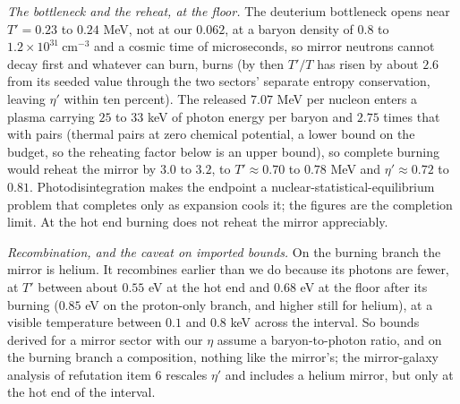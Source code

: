 \documentclass[11pt]{article}
\theoremstyle{definition}
\theoremstyle{plain}
\begin{document}
\smallskip\noindent\emph{The bottleneck and the reheat, at the floor.} The deuterium bottleneck opens near $T' = 0.23$ to $0.24$ MeV, not at our $0.062$, at a baryon density of $0.8$ to $1.2 \times 10^{31}\ \mathrm{cm^{-3}}$ and a cosmic time of microseconds, so mirror neutrons cannot decay first and whatever can burn, burns (by then $T'/T$ has risen by about $2.6$ from its seeded value through the two sectors' separate entropy conservation, leaving $\eta'$ within ten percent). The released $7.07$ MeV per nucleon enters a plasma carrying $25$ to $33$ keV of photon energy per baryon and $2.75$ times that with pairs (thermal pairs at zero chemical potential, a lower bound on the budget, so the reheating factor below is an upper bound), so complete burning would reheat the mirror by $3.0$ to $3.2$, to $T' \approx 0.70$ to $0.78$ MeV and $\eta' \approx 0.72$ to $0.81$. Photodisintegration makes the endpoint a nuclear-statistical-equilibrium problem that completes only as expansion cools it; the figures are the completion limit. At the hot end burning does not reheat the mirror appreciably.

\smallskip\noindent\emph{Recombination, and the caveat on imported bounds.} On the burning branch the mirror is helium. It recombines earlier than we do because its photons are fewer, at $T'$ between about $0.55$ eV at the hot end and $0.68$ eV at the floor after its burning ($0.85$ eV on the proton-only branch, and higher still for helium), at a visible temperature between $0.1$ and $0.8$ keV across the interval. So bounds derived for a mirror sector with our $\eta$ assume a baryon-to-photon ratio, and on the burning branch a composition, nothing like the mirror's; the mirror-galaxy analysis of refutation item 6 rescales $\eta'$ and includes a helium mirror, but only at the hot end of the interval.
\end{document}
